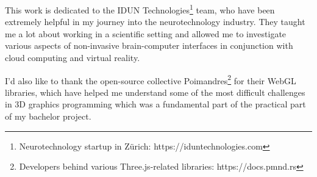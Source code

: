 \begin{dedication}

  This work is dedicated to the IDUN Technologies\footnote{Neurotechnology startup in Zürich: https://iduntechnologies.com} team, who have been extremely helpful in my journey into the neurotechnology industry. They taught me a lot about working in a scientific setting and allowed me to investigate various aspects of non-invasive brain-computer interfaces in conjunction with cloud computing and virtual reality.

  \hfill \break

  I'd also like to thank the open-source collective Poimandres\footnote{Developers behind various Three.js-related libraries: https://docs.pmnd.rs} for their WebGL libraries, which have helped me understand some of the most difficult challenges in 3D graphics programming which was a fundamental part of the practical part of my bachelor project.

\end{dedication}
